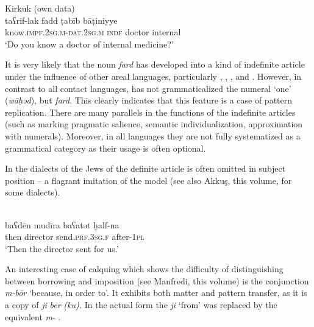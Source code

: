 \documentclass[output=paper]{langsci/langscibook}
\begin{document}
\ea\label{fadd} 
{Kirkuk (own data)}\\
\gll taʕrif-lak fadd ṭabīb bāṭiniyye\\
     know.\textsc{impf.2sg.m-dat.2sg.m} \textsc{indf} doctor internal \\
\glt ‘Do you know a doctor of internal medicine?'
\z

It is very likely that the noun \textit{fard} has developed into a kind of {indefinite article} under the influence of other areal languages, particularly , , , and . However, in contrast to all contact languages,   has not grammaticalized the numeral ‘one’ (\textit{wāḥəd}), but \textit{fard}. This clearly indicates that this feature is a case of pattern {replication}. There are many parallels in the functions of the indefinite articles (such as marking pragmatic salience, semantic individualization, approximation with {numerals}). Moreover, in all languages they are not fully systematized as a grammatical category as their usage is often optional. 

In the dialects of the {Jews} of  the {definite} {article} is often omitted in subject position – a flagrant imitation of the  model (see also Akkuş, this volume, for some  dialects).

\ea 
{  \citep[71]{Jastrow1990chapter}} \\
\gll baʕdēn mudīra baʕatət ḫalf-na\\
     then director send.\textsc{prf.3sg.f} after-\textsc{1pl}\\
\glt ‘Then the director sent for us.’
\z

An interesting case of {calquing} which shows the difficulty of distinguishing between borrowing and {imposition} (see Manfredi, this volume) is the conjunction \textit{m-bōr} ‘because, in order to’. It exhibits both matter and pattern {transfer}, as it is a copy of  \textit{ji} \textit{ber} \textit{(ku).} In the actual form the  \textit{ji} ‘from’ was replaced by the  equivalent \textit{m}{}- \citep[64]{Jastrow1979}. 
\end{document}
